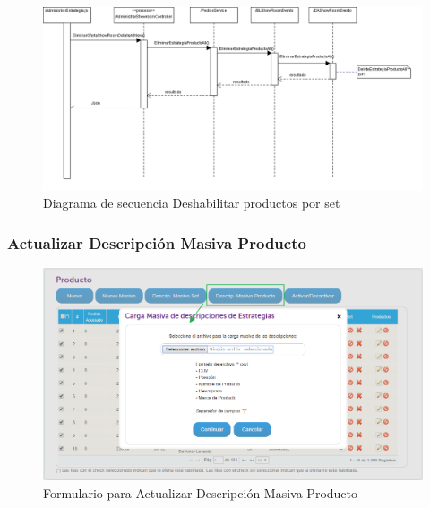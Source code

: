 \documentclass[a4paper,11pt]{paper}
\begin{document}
\begin{landscape}
\begin{figure}[!h]
\centering
\includegraphics[width=1.5\textwidth]{imgs/Producto/EliminarTodo.png}
\caption{Diagrama de secuencia Deshabilitar productos por set}
\end{figure}
\end{landscape} 



\newpage
\subsubsection{Actualizar Descripción Masiva Producto}

\begin{figure}[h]
\centering
\includegraphics[width=1.0\textwidth]{imgs/Producto/FormularioActualizarDescripcionMasivaProducto.png}
\caption{Formulario para Actualizar Descripción Masiva Producto}
\end{figure}
\end{document}
